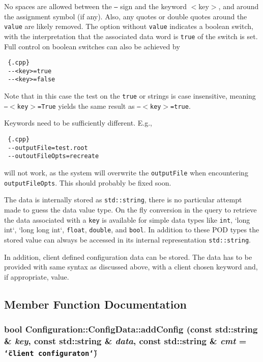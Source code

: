 No spaces are allowed between the {\tt --} sign and the keyword {\tt } $<$key$>$, and around the assignment symbol (if any). Also, any quotes or double quotes around the {\tt value} are likely removed. The option without {\tt value} indicates a boolean switch, with the interpretation that the associated data word is {\tt true} of the switch is set. Full control on boolean switches can also be achieved by 

\begin{Code}\begin{verbatim} {.cpp}
 --<key>=true
 --<key>=false
\end{verbatim}\end{Code}

 Note that in this case the test on the {\tt true} or  strings is case insensitive, meaning {\tt --$<$key$>$=True} yields the same result as {\tt --$<$key$>$=true}.

Keywords need to be sufficiently different. E.g., 

\begin{Code}\begin{verbatim} {.cpp}
 --outputFile=test.root
 --outoutFileOpts=recreate
\end{verbatim}\end{Code}

 will not work, as the system will overwrite the {\tt output\-File} when encountering {\tt output\-File\-Opts}. This should probably be fixed soon.

The data is internally stored as {\tt std::string}, there is no particular attempt made to guess the data value type. On the fly conversion in the query to retrieve the data associated with a {\tt key} is available for simple data types like {\tt int}, `long int`, `long long int`, {\tt float}, {\tt double}, and {\tt bool}. In addition to these POD types the stored value can always be accessed in its internal representation {\tt std::string}.

In addition, client defined configuration data can be stored. The data has to be provided with same syntax as discussed above, with a client chosen keyword and, if appropriate, value. 



\subsection{Member Function Documentation}
\hypertarget{classConfiguration_1_1ConfigData_02a4f9464ec6ef54ecb0d5ab622510d5}{
\subsubsection[addConfig]{\setlength{\rightskip}{0pt plus 5cm}bool Configuration::Config\-Data::add\-Config (const std::string \& {\em key}, const std::string \& {\em data}, const std::string \& {\em cmt} = {\tt \char`\"{}client~configuraton\char`\"{}})}}
\label{classConfiguration_1_1ConfigData_02a4f9464ec6ef54ecb0d5ab622510d5}



